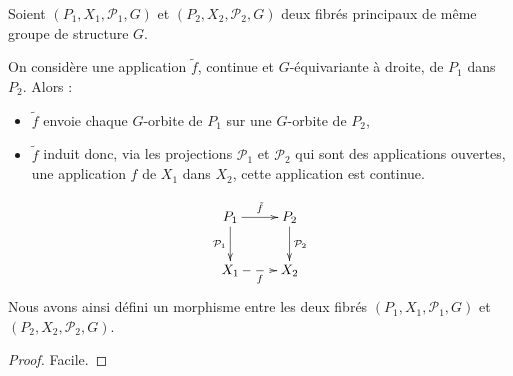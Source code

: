\begin{prefi}
Soient $(P_1,X_1,\mathcal{P}_1,G)$ et $(P_2,X_2,\mathcal{P}_2,G)$ deux fibrés principaux de même groupe de structure $G$.

\par
On considère une application $\tilde{f}$, continue et $G$-équivariante à droite, de $P_1$ dans $P_2$. Alors :
\begin{itemize}
\item $\tilde{f}$ envoie chaque $G$-orbite de $P_1$ sur une $G$-orbite de $P_2$,
\item $\tilde{f}$ induit donc, via les projections $\mathcal{P}_1$ et $\mathcal{P}_2$ qui sont des applications ouvertes, %
une application $f$ de $X_1$ dans $X_2$, cette application est continue.
\end{itemize}
\[\xymatrix{%
P_1\ar[d]_{\mathcal{P}_1}\ar[r]^{\tilde{f}}&P_2\ar[d]^{\mathcal{P}_2}\\%
X_1\ar@{-->}[r]_{f}&X_2%
}\]
Nous avons ainsi d\'efini un morphisme entre les deux fibr\'es $(P_1,X_1,\mathcal{P}_1,G)$ et $(P_2,X_2,\mathcal{P}_2,G)$.
\end{prefi}

\begin{proof}
Facile.
\end{proof}

